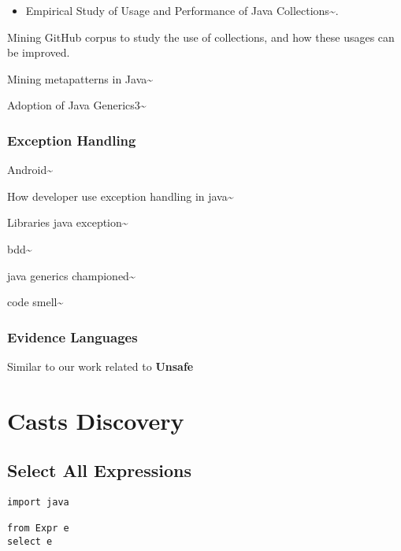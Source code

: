 \documentclass{usiinfdocprop}
\begin{document}
\begin{itemize}
\item Empirical Study of Usage and Performance of Java Collections\textasciitilde{}\cite{Costa:2017:ESU:3030207.3030221}.
\end{itemize}
Mining GitHub corpus to study the use of collections, and how these usages can be improved. 


Mining metapatterns in Java\textasciitilde{}\cite{DBLP:conf/msr/PosnettBD10} 


Adoption of Java Generics3\textasciitilde{}\cite{Parnin:2013:AUJ:2589712.2589717} 

\subsection{Exception Handling} 

Android\textasciitilde{}\cite{7180074} 

How developer use exception handling in java\textasciitilde{}\cite{Asaduzzaman:2016:DUE:2901739.2903500} 

Libraries java exception\textasciitilde{}\cite{Sena:2016:UEH:2901739.2901757} 

bdd\textasciitilde{}\cite{Lhotak:2008:EBC:1391984.1391987} 

java generics championed\textasciitilde{}\cite{Parnin:2011:JGA:1985441.1985446} 

code smell\textasciitilde{}\cite{Counsell:2010:SCS:1809223.1809228} 

\subsection{Evidence Languages} 

Similar to our work related to \textbf{Unsafe} \cite{Mastrangelo:2015:UYO:2814270.2814313} 

\chapter{Casts Discovery}
\label{sec:org8b3b70c}

\section{Select All Expressions}
\label{sec:org03ce0ad}

\lstset{language=ql,label= ,caption= ,captionpos=b,numbers=none}
\begin{lstlisting}
import java

from Expr e
select e
\end{lstlisting}
\end{document}
